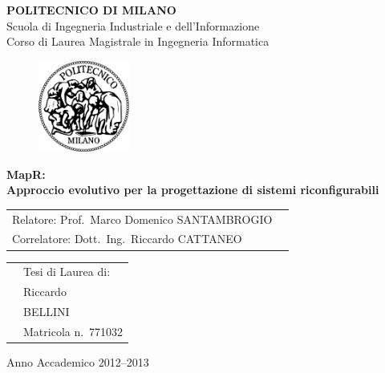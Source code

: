 \documentclass[a4paper]{report}
\begin{document}
\begin{titlepage}

\begin{center}
\LARGE
\textbf{POLITECNICO DI MILANO} \\
\Large
Scuola di Ingegneria Industriale e dell'Informazione \\
Corso di Laurea Magistrale in Ingegneria Informatica
\end{center}

\addvspace{1.5cm}
\begin{figure}[h]
\begin{center}
\includegraphics[width=3cm]{figure/PoliMi}
\end{center}
\end{figure}

\addvspace{0.75cm}
\begin{center}
\LARGE
\textbf{MapR:\\Approccio evolutivo per la progettazione di sistemi riconfigurabili}
\end{center}

\addvspace{4cm}
\Large
\begin{center}
\begin{tabular}{p{}p{}}
Relatore: Prof.~Marco Domenico SANTAMBROGIO& \\
Correlatore: Dott.~Ing.~Riccardo CATTANEO& \\ %
\end{tabular}
\end{center}

\addvspace{2cm}
\Large
\begin{center}
\begin{tabular}{p{}p{}}
& Tesi di Laurea di: \\
& Riccardo \\ 
& BELLINI \\
& Matricola n.~771032
\end{tabular}
\end{center}

\vfill
\Large
\begin{center}
Anno Accademico 2012--2013
\end{center}
\end{titlepage}
\end{document}
